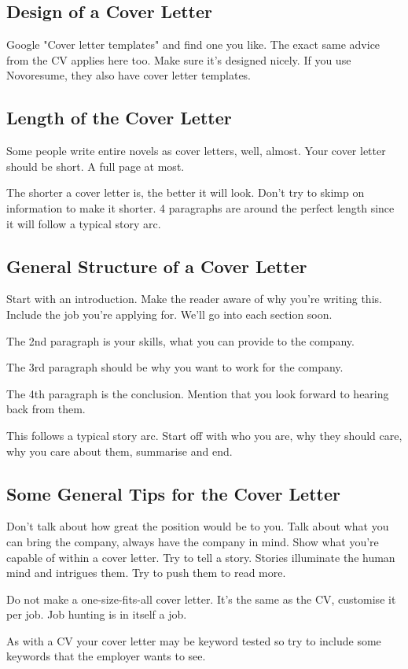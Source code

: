 \documentclass{article}
\begin{document}
\subsection{Design of a Cover Letter}
Google "Cover letter templates" and find one you like. The exact same
advice from the CV applies here too. Make sure it's designed nicely. If
you use Novoresume, they also have cover letter templates.

\subsection{Length of the Cover Letter}
Some people write entire novels as cover letters, well, almost. Your
cover letter should be short. A full page at most.

The shorter a cover letter is, the better it will look. Don't try to
skimp on information to make it shorter. 4 paragraphs are around the
perfect length since it will follow a typical story arc.
\subsection{General Structure of a Cover Letter}
Start with an introduction. Make the reader aware of why you're writing
this. Include the job you're applying for. We'll go into each section
soon.

The 2nd paragraph is your skills, what you can provide to the company.

The 3rd paragraph should be why you want to work for the company.

The 4th paragraph is the conclusion. Mention that you look forward to
hearing back from them.

This follows a typical story arc. Start off with who you are, why they
should care, why you care about them, summarise and end.
\subsection{Some General Tips for the Cover Letter}
Don't talk about how great the position would be to you. Talk about what
you can bring the company, always have the company in mind. Show what
you're capable of within a cover letter. Try to tell a story. Stories
illuminate the human mind and intrigues them. Try to push them to read
more.

Do not make a one-size-fits-all cover letter. It's the same as the CV,
customise it per job. Job hunting is in itself a job.

As with a CV your cover letter may be keyword tested so try to include
some keywords that the employer wants to see.
\end{document}
